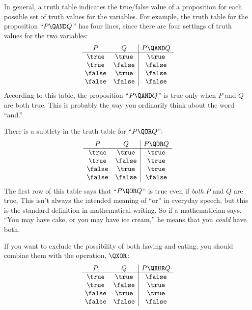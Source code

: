 In general, a truth table indicates the true/false value of a proposition
for each possible set of truth values for the variables.  For example, the
truth table for the proposition ``$P \QAND Q$'' has four lines, since
there are four settings of truth values for the two variables:
%
\[
\begin{array}{cc|c}
P & Q & P \QAND Q \\ \hline
\true & \true & \true \\
\true & \false & \false \\
\false & \true & \false \\
\false & \false & \false
\end{array}
\]
%
According to this table, the proposition ``$P \QAND Q$'' is true only when
$P$ and $Q$ are both true.  This is probably the way you ordinarily think
about the word ``and.''

There is a subtlety in the truth table for ``$P \QOR Q$'':
%
\[
\begin{array}{cc|c}
P & Q & P \QOR Q \\ \hline
\true & \true & \true \\
\true & \false & \true \\
\false & \true & \true \\
\false & \false & \false
\end{array}
\]
%
The first row of this table says that ``$P \QOR Q$'' is true even if
\textit{both} $P$ and $Q$ are true.  This isn't always the intended
meaning of ``or'' in everyday speech, but this is the standard definition
in mathematical writing.  So if a mathematician says, ``You may have cake,
or you may have ice cream,'' he means that you \textit{could} have both.

If you want to exclude the possibility of both having and eating, you
should combine them with the  operation, $\QXOR$:
%
\[\begin{array}{cc|c}
P & Q & P \QXOR Q \\ \hline
\true & \true & \false \\
\true & \false & \true \\
\false & \true & \true \\
\false & \false & \false
\end{array}
\]

\subsection{\QIMPLIES}

